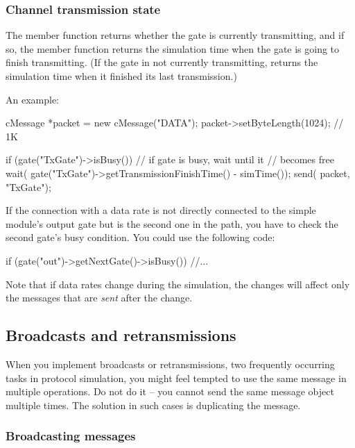 \subsubsection{Channel transmission state}
\label{sec:simple-modules:cgate-transmission-state}

The  member function returns whether the gate
is currently transmitting, and if so, the
 member function
returns the simulation time when the gate is going to finish
transmitting. (If the gate in not currently transmitting,
 returns the simulation time
when it finished its last transmission.)

An example:

\begin{cpp}
cMessage *packet = new cMessage("DATA");
packet->setByteLength(1024);  // 1K

if (gate("TxGate")->isBusy()) // if gate is busy, wait until it
{                             // becomes free
  wait( gate("TxGate")->getTransmissionFinishTime() - simTime());
}
send( packet, "TxGate");
\end{cpp}

If the connection with a data rate is not directly connected
to the simple module's output gate but is the second
one in the path, you have to check the second gate's busy
condition. You could use the following
code:

\begin{cpp}
if (gate("out")->getNextGate()->isBusy())
  //...
\end{cpp}

Note that if data rates change during the
simulation, the changes will affect only the messages that are
\textit{sent} after the change.



\subsection{Broadcasts and retransmissions}

When you implement broadcasts or retransmissions, two frequently
occurring tasks in protocol simulation, you might feel tempted
to use the same message in multiple  operations.
Do not do it -- you cannot send the same message object multiple times.
The solution in such cases is duplicating the message.

\subsubsection{Broadcasting messages}

